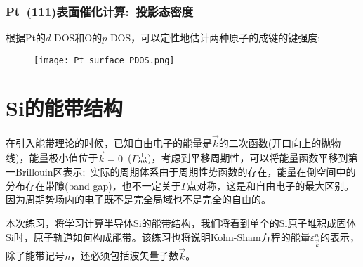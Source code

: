 \frame
{
	\frametitle{\textrm{Pt~(111)}表面催化计算:~投影态密度}

	根据\textrm{Pt}的$d$-\textrm{DOS}和\textrm{O}的$p$-DOS，可以定性地估计两种原子的成键的键强度:~\\
\begin{figure}[h!]
\centering
\texttt{[image: Pt\_surface\_PDOS.png]}
\caption{\fontsize{6.2pt}{5.2pt}}%
\label{Pt_surface_PDOS}
\end{figure}
}
\section{Si的能带结构}\label{Sec:Si-band}
在引入能带理论的时候，已知自由电子的能量是$\vec k$的二次函数(开口向上的抛物线)，能量极小值位于$\vec k=0$~($\Gamma$点)，考虑到平移周期性，可以将能量函数平移到第一\textrm{Brillouin}区表示;~实际的周期体系由于周期性势函数的存在，能量在倒空间中的分布存在带隙\textrm{(band gap)}，也不一定关于$\Gamma$点对称，这是和自由电子的最大区别。因为周期势场内的电子既不是完全局域也不是完全的自由的。

本次练习，将学习计算半导体\textrm{Si}的能带结构，我们将看到单个的\textrm{Si}原子堆积成固体\textrm{Si}时，原子轨道如何构成能带。该练习也将说明\textrm{Kohn-Sham}方程的能量$\varepsilon_{\vec k}^n$的表示，除了能带记号$n$，还必须包括波矢量子数$\vec k$。
